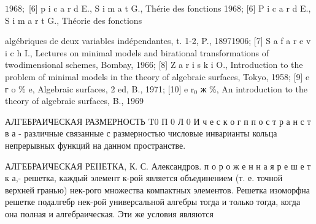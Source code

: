 \documentclass[10pt]{article}
\begin{document}
$1968 ;$ [6] p i c a r d E., S i m a t G., Thérie des fonctions 1968; [6] P i c a r d E., S i m a r t G., Théorie des fonctions

algébriques de deux variables indépendantes, t. 1-2, P., 18971906; [7] S a f a r e v i c h I., Lectures on minimal models and birational transformations of twodimensional schemes, Bombay, 1966; [8] Z a r i s k i O., Introduction to the problem of minimal models in the theory of algebraic surfaces, Tokyo, 1958; [9] e г o $\%$ e, Algebraic surfaces, 2 ed, B., 1971; [10] e $\mathrm{r}_{0}$ ж \%, An introduction to the theory of algebraic surfaces, B., 1969



АЛГЕБРАИЧЕСКАЯ РАЗМЕРНОСТЬ $\mathrm{T} 0$ П 0 Л 0 И ч е с к о г п п о с т р а н с т в а - различные связанные с размерностью числовые инварианты кольца непрерывных функций на данном пространстве.



АЛГЕБРАИЧЕСКАЯ РЕIIЕТКА, К. С. Александров. п о р о ж е н н а я р е ш е т к а,- решетка, каждый элемент к-рой является объединением (т. е. точной верхней гранью) нек-рого множества компактных элементов. Решетка изоморфна решетке подалгебр нек-рой универсальной алгебры тогда и только тогда, когда она полная и алгебраическая. Эти же условия являются
\end{document}
